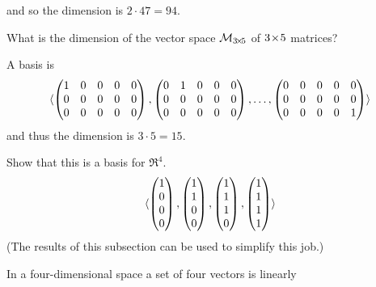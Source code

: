 \begin{exercises}
\begin{answer}
\begin{equation*}
      \end{equation*}   
      and so the dimension is \( 2\cdot 47=94 \).
    \end{answer}
  \item  
    What is the dimension of the vector space $\mathcal{M}_{3 \! \times \! 5}$ 
    of \( 3 \! \times \! 5 \) matrices?
    \begin{answer}
      A basis is
      \begin{equation*}
        \langle
          \begin{pmatrix}
            1  &0  &0  &0  &0  \\
            0  &0  &0  &0  &0  \\
            0  &0  &0  &0  &0
          \end{pmatrix},
          \begin{pmatrix}
            0  &1  &0  &0  &0  \\
            0  &0  &0  &0  &0  \\
            0  &0  &0  &0  &0
          \end{pmatrix},
          \dots,
          \begin{pmatrix}
            0  &0  &0  &0  &0  \\
            0  &0  &0  &0  &0  \\
            0  &0  &0  &0  &1
          \end{pmatrix}  \rangle
      \end{equation*}
      and thus the dimension is \( 3\cdot 5=15 \).  
    \end{answer}
  \recommended \item 
    Show that this is a basis for $\Re^4$.
    \begin{equation*}
      \langle\begin{pmatrix} 1 \\ 0 \\ 0 \\ 0 \end{pmatrix},
        \begin{pmatrix} 1 \\ 1 \\ 0 \\ 0 \end{pmatrix},
        \begin{pmatrix} 1 \\ 1 \\ 1 \\ 0 \end{pmatrix},
        \begin{pmatrix} 1 \\ 1 \\ 1 \\ 1 \end{pmatrix} \rangle
    \end{equation*}
    (The results of this subsection can be used to simplify this job.)
    \begin{answer}
       In a four-dimensional space a set of four vectors is linearly

\end{answer}
\end{exercises}
